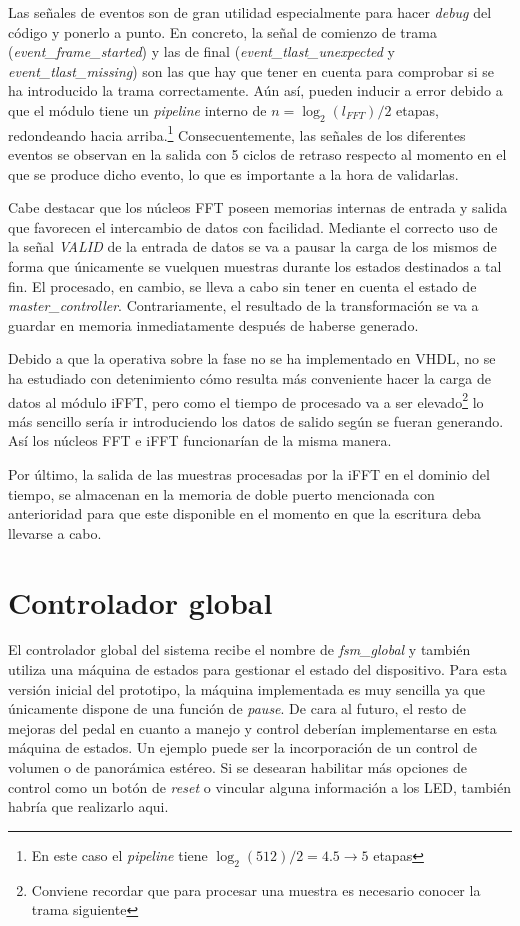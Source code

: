 Las señales de eventos son de gran utilidad especialmente para hacer \emph{debug} del código y ponerlo a punto. En concreto, la señal de comienzo de trama (\emph{event\_frame\_started}) y las de final (\emph{event\_tlast\_unexpected} y \emph{event\_tlast\_missing}) son las que hay que tener en cuenta para comprobar si se ha introducido la trama correctamente. Aún así, pueden inducir a error debido a que el módulo tiene un \emph{pipeline} interno de $n=\log_{2}(l_{FFT})/2$ etapas, redondeando hacia arriba.\footnote{En este caso el \emph{pipeline} tiene $\log_{2}(512)/2 = 4.5 \rightarrow 5$ etapas} Consecuentemente, las señales de los diferentes eventos se observan en la salida con 5 ciclos de retraso respecto al momento en el que se produce dicho evento, lo que es importante a la hora de validarlas.

Cabe destacar que los núcleos FFT poseen memorias internas de entrada y salida que favorecen el intercambio de datos con facilidad. Mediante el correcto uso de la señal \emph{VALID} de la entrada de datos se va a pausar la carga de los mismos de forma que únicamente se vuelquen muestras durante los estados destinados a tal fin. El procesado, en cambio, se lleva a cabo sin tener en cuenta el estado de \emph{master\_controller}. Contrariamente, el resultado de la transformación se va a guardar en memoria inmediatamente después de haberse generado.

Debido a que la operativa sobre la fase no se ha implementado en VHDL, no se ha estudiado con detenimiento cómo resulta más conveniente hacer la carga de datos al módulo iFFT, pero como el tiempo de procesado va a ser elevado\footnote{Conviene recordar que para procesar una muestra es necesario conocer la trama siguiente} lo más sencillo sería ir introduciendo los datos de salido según se fueran generando. Así los núcleos FFT e iFFT funcionarían de la misma manera.

Por último, la salida de las muestras procesadas por la iFFT en el dominio del tiempo, se almacenan en la memoria de doble puerto mencionada con anterioridad para que este disponible en el momento en que la escritura deba llevarse a cabo.

\section{Controlador global}
El controlador global del sistema recibe el nombre de \emph{fsm\_global} y también utiliza una máquina de estados para gestionar el estado del dispositivo. Para esta versión inicial del prototipo, la máquina implementada es muy sencilla ya que únicamente dispone de una función de \emph{pause}. De cara al futuro, el resto de mejoras del pedal en cuanto a manejo y control deberían implementarse en esta máquina de estados. Un ejemplo puede ser la incorporación de un control de volumen o de panorámica estéreo. Si se desearan habilitar más opciones de control como un botón de \emph{reset} o vincular alguna información a los LED, también habría que realizarlo aqui.

